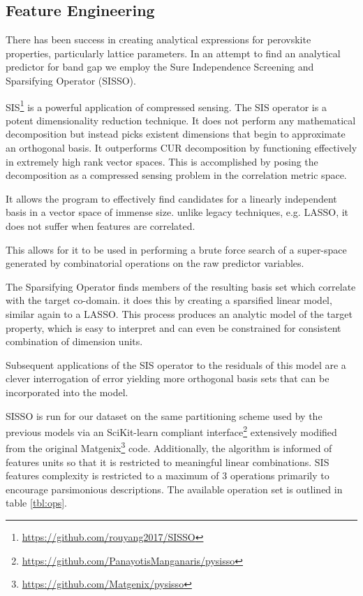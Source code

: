 \subsection{Feature Engineering}
\label{sec:org2a561c9}
There has been success in creating analytical expressions for perovskite properties, particularly lattice parameters.
\autocite{jiang-2006-predic-lattic} In an attempt to find an analytical predictor for band gap we employ the Sure Independence Screening and Sparsifying Operator (SISSO).
\autocite{ouyang-2018-sisso} 

SIS\footnote{\url{https://github.com/rouyang2017/SISSO}} is a powerful application of compressed sensing.
\autocite{ghiringhelli-2017-learn-physic}
The SIS operator is a potent dimensionality reduction technique.
It does not perform any mathematical decomposition but instead picks existent dimensions that begin to approximate an orthogonal basis.
It outperforms CUR decomposition by functioning effectively in extremely high rank vector spaces.
\autocite{ray-2021-various-dimen,hamm-2019-cur-decom}
This is accomplished by posing the decomposition as a compressed sensing problem in the correlation metric space.

It allows the program to effectively find candidates for a linearly independent basis in a vector space of immense size.
unlike legacy techniques, e.g.
LASSO, it does not suffer when features are correlated.
\autocite{tibshirani-1996-regres-shrin,gauraha-2018-introd-to-lasso}

This allows for it to be used in performing a brute force search of a super-space generated by combinatorial operations on the raw predictor variables.

The Sparsifying Operator finds members of the resulting basis set which correlate with the target co-domain.
it does this by creating a sparsified linear model, similar again to a LASSO.
This process produces an analytic model of the target property, which is easy to interpret and can even be constrained for consistent combination of dimension units.

Subsequent applications of the SIS operator to the residuals of this model are a clever interrogation of error yielding more orthogonal basis sets that can be incorporated into the model.
\autocite{mayo-1998-error-growt}

SISSO is run for our dataset on the same partitioning scheme used by the previous models via an SciKit-learn compliant \autocite{buitinck-2013-api} interface\footnote{\url{https://github.com/PanayotisManganaris/pysisso}} extensively modified from the original Matgenix\footnote{\url{https://github.com/Matgenix/pysisso}} code.
Additionally, the algorithm is informed of features units so that it is restricted to meaningful linear combinations.
SIS features complexity is restricted to a maximum of 3 operations primarily to encourage parsimonious descriptions.
The available operation set is outlined in table \ref{tbl:ops}.

